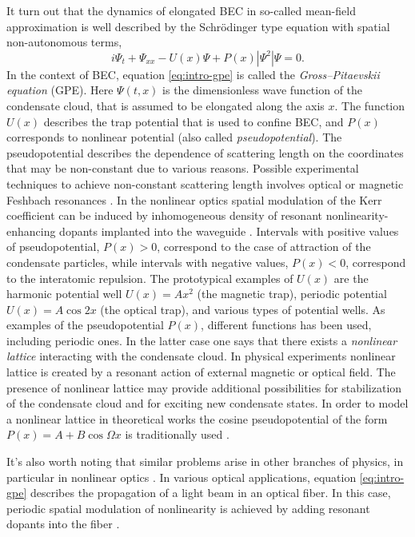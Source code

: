 It turn out that the dynamics of elongated BEC in so-called mean-field approximation is well described by the Schr\"odinger type equation with spatial non-autonomous terms,
\begin{equation}
	i \Psi_t + \Psi_{xx} - U(x) \Psi + P(x) |\Psi^2| \Psi = 0.
\label{eq:intro-gpe}
\end{equation}
In the context of BEC, equation \eqref{eq:intro-gpe} is called the {\it Gross--Pitaevskii equation} (GPE).
Here $\Psi(t, x)$ is the dimensionless wave function of the condensate cloud, that is assumed to be elongated along the axis $x$.
The function $U(x)$ describes the trap potential that is used to confine BEC, and $P(x)$ corresponds to nonlinear potential (also called {\it pseudopotential}).
The pseudopotential describes the dependence of scattering length on the coordinates that may be non-constant due to various reasons.
Possible experimental techniques to achieve non-constant scattering length involves optical or magnetic Feshbach resonances \cite{PollackDriesJunkerChenCorcovilosHulet, ChinGrimmJulienneTsienga, BauerLetterVoRempeDurr}.
In the nonlinear optics spatial modulation of the Kerr coefficient can be induced by inhomogeneous density of resonant nonlinearity-enhancing dopants implanted into the waveguide \cite{HukriedeRundeKip}.
Intervals with positive values of pseudopotential, $P(x) > 0$, correspond to the case of attraction of the condensate particles, while intervals with negative values, $P(x) < 0$, correspond to the interatomic repulsion.
The prototypical examples of $U(x)$ are the harmonic potential well $U(x) = Ax^2$ (the magnetic trap), periodic potential $U(x) = A \cos 2x$ (the optical trap), and various types of potential wells.
As examples of the pseudopotential $P(x)$, different functions has been used, including periodic ones.
In the latter case one says that there exists a {\it nonlinear lattice} interacting with the condensate cloud.
In physical experiments nonlinear lattice is created by a resonant action of external magnetic \cite{InouyeAndrewsStengerMiesnerStamperKurnKetterle} or optical \cite{ClarkHaXuChin} field.
The presence of nonlinear lattice may provide additional possibilities for stabilization of the condensate cloud and for exciting new condensate states.
In order to model a nonlinear lattice in theoretical works the cosine pseudopotential of the form $P(x) = A + B \cos \Omega x$ is traditionally used \cite{SakaguchiMalomed}.

It's also worth noting that similar problems arise in other branches of physics, in particular in nonlinear optics \cite{KartashovMalomedTorner}.
In various optical applications, equation \eqref{eq:intro-gpe} describes the propagation of a light beam in an optical fiber.
In this case, periodic spatial modulation of nonlinearity is achieved by adding resonant dopants into the fiber \cite{HukriedeRundeKip}.

